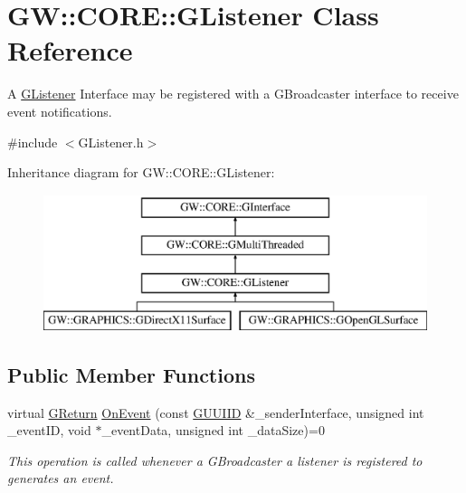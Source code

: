 \hypertarget{class_g_w_1_1_c_o_r_e_1_1_g_listener}{}\section{GW\+:\+:C\+O\+RE\+:\+:G\+Listener Class Reference}
\label{class_g_w_1_1_c_o_r_e_1_1_g_listener}


A \mbox{\hyperlink{class_g_w_1_1_c_o_r_e_1_1_g_listener}{G\+Listener}} Interface may be registered with a G\+Broadcaster interface to receive event notifications.  




{\ttfamily \#include $<$G\+Listener.\+h$>$}

Inheritance diagram for GW\+:\+:C\+O\+RE\+:\+:G\+Listener\+:\begin{figure}[H]
\begin{center}
\leavevmode
\includegraphics[height=4.000000cm]{class_g_w_1_1_c_o_r_e_1_1_g_listener}
\end{center}
\end{figure}
\subsection*{Public Member Functions}
\begin{DoxyCompactItemize}
\item 
virtual \mbox{\hyperlink{namespace_g_w_a67a839e3df7ea8a5c5686613a7a3de21}{G\+Return}} \mbox{\hyperlink{class_g_w_1_1_c_o_r_e_1_1_g_listener_a5c1d1fac213b7a1cc15d384aa0c33105}{On\+Event}} (const \mbox{\hyperlink{struct_g_w_1_1_g_u_u_i_i_d}{G\+U\+U\+I\+ID}} \&\+\_\+sender\+Interface, unsigned int \+\_\+event\+ID, void $\ast$\+\_\+event\+Data, unsigned int \+\_\+data\+Size)=0
\begin{DoxyCompactList}\small\item\em This operation is called whenever a G\+Broadcaster a listener is registered to generates an event. \end{DoxyCompactList}\end{DoxyCompactItemize}


